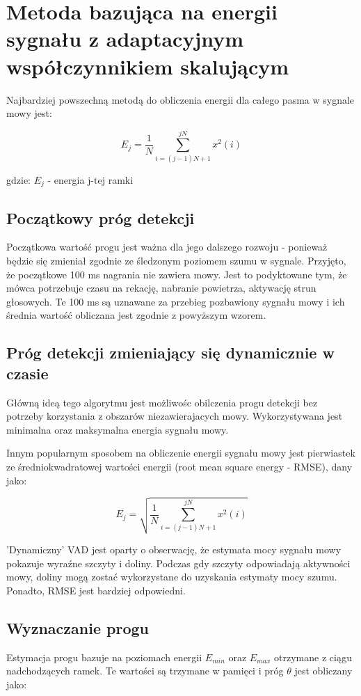 \documentclass[eng,printmode]{mgr}
\begin{document}
	 
 \section{Metoda bazująca na energii sygnału z adaptacyjnym współczynnikiem skalującym}
 
 Najbardziej powszechną metodą do obliczenia energii dla całego pasma  w sygnale mowy jest:
 
 $$ E_{j} =\frac{1}{N}\sum_{i=(j-1)N+1}^{jN}x^2(i)$$
 
 \hspace{8cm}gdzie: $E_{j}$ - energia j-tej ramki
 
 
  \subsection{Początkowy próg detekcji}
  Początkowa wartość progu jest ważna dla jego dalszego rozwoju - ponieważ będzie się zmieniał zgodnie ze śledzonym poziomem szumu w sygnale. Przyjęto, że początkowe 100 ms nagrania nie zawiera mowy. Jest to podyktowane tym, że mówca potrzebuje czasu na rekację, nabranie powietrza, aktywację strun głosowych. Te 100 ms są uznawane za przebieg pozbawiony sygnału mowy i ich średnia wartość obliczana jest zgodnie z powyższym wzorem.
  
  \subsection{Próg detekcji zmieniający się dynamicznie w czasie}
  Główną ideą tego algorytmu jest możliwośc obilczenia progu detekcji bez potrzeby korzystania z obszarów niezawierajacych mowy. Wykorzystywana jest minimalna oraz maksymalna energia sygnału mowy.   
  
  Innym popularnym sposobem na obliczenie energii sygnału mowy jest pierwiastek ze średniokwadratowej wartości energii (root mean square energy - RMSE), dany jako:
  
  $$ E_{j} =\sqrt{\frac{1}{N}\sum_{i=(j-1)N+1}^{jN}x^2(i)}$$
  
  'Dynamiczny' VAD jest oparty o obserwację, że estymata mocy sygnału mowy pokazuje wyraźne szczyty i doliny. Podczas gdy szczyty odpowiadają aktywności mowy, doliny mogą zostać wykorzystane do uzyskania estymaty mocy szumu. Ponadto, RMSE jest bardziej odpowiedni.
  
  \subsection{Wyznaczanie progu}
 Estymacja progu bazuje na poziomach energii $E_{min}$ oraz $E_{max}$ otrzymane z ciągu nadchodzących ramek. Te wartości są trzymane w pamięci i próg $\theta$ jest obliczany jako:
 
\end{document}
